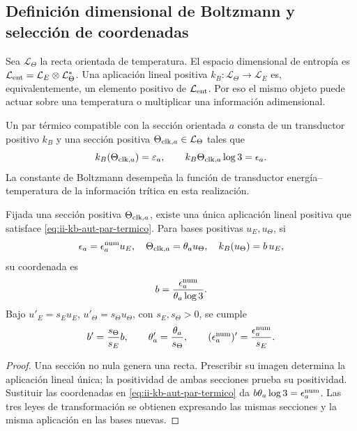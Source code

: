 \subsection{Definición dimensional de Boltzmann y selección de coordenadas}

Sea \(\mathcal L_\Theta\) la recta orientada de temperatura.
El espacio dimensional de entropía es
\(\mathcal L_{\rm ent}=\mathcal L_E\otimes\mathcal L_\Theta^*\).
Una aplicación lineal positiva
\(k_B:\mathcal L_\Theta\to\mathcal L_E\) es, equivalentemente,
un elemento positivo de \(\mathcal L_{\rm ent}\). Por eso el mismo
objeto puede actuar sobre una temperatura o multiplicar una información
adimensional.

\begin{definition}
Un par térmico compatible con la sección orientada \(a\) consta de
un transductor positivo \(k_B\) y una sección positiva
\(\Theta_{{\rm clk},a}\in\mathcal L_\Theta\) tales que
\begin{equation}
 k_B(\Theta_{{\rm clk},a})=\varepsilon_a,
 \qquad
 k_B\Theta_{{\rm clk},a}\log3=\epsilon_a.
 \label{eq:ii-kb-aut-par-termico}
\end{equation}
La constante de Boltzmann desempeña la función de transductor
energía--temperatura de la información trítica en esta realización.
\end{definition}

\begin{theorem}
Fijada una sección positiva \(\Theta_{{\rm clk},a}\), existe una
única aplicación lineal positiva que satisface
\eqref{eq:ii-kb-aut-par-termico}. Para bases positivas \(u_E,u_\Theta\),
si
\[
 \epsilon_a=\epsilon_a^{\rm num}u_E,\quad
 \Theta_{{\rm clk},a}=\theta_a u_\Theta,\quad
 k_B(u_\Theta)=b\,u_E,
\]
su coordenada es
\begin{equation}
 b=\frac{\epsilon_a^{\rm num}}{\theta_a\log3}.
 \label{eq:ii-kb-aut-coordenada}
\end{equation}
Bajo \(u'_E=s_Eu_E\), \(u'_\Theta=s_\Theta u_\Theta\), con
\(s_E,s_\Theta>0\), se cumple
\[
 b'=\frac{s_\Theta}{s_E}b,\qquad
 \theta'_a=\frac{\theta_a}{s_\Theta},\qquad
 (\epsilon_a^{\rm num})'=\frac{\epsilon_a^{\rm num}}{s_E}.
\]
\end{theorem}
\begin{proof}
Una sección no nula genera una recta. Prescribir su imagen determina
la aplicación lineal única; la positividad de ambas secciones prueba
su positividad. Sustituir las coordenadas en
\eqref{eq:ii-kb-aut-par-termico} da
\(b\theta_a\log3=\epsilon_a^{\rm num}\). Las tres leyes de
transformación se obtienen expresando las mismas secciones y la misma
aplicación en las bases nuevas.
\end{proof}

